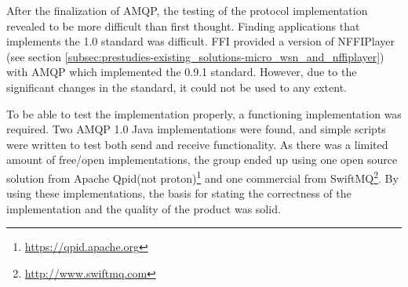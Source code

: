 After the finalization of AMQP, the testing of the protocol implementation revealed to be more difficult than first thought. Finding applications that implements the 1.0 standard was difficult. FFI provided a version of NFFIPlayer (see section \ref{subsec:prestudies-existing_solutions-micro_wsn_and_nffiplayer}) with AMQP which implemented the 0.9.1 standard. However, due to the significant changes in the standard, it could not be used to any extent.

To be able to test the implementation properly, a functioning implementation was required. Two AMQP 1.0 Java implementations were found, and simple scripts were written to test both send and receive functionality. As there was a limited amount of free/open implementations, the group ended up using one open source solution from Apache Qpid(not proton)\footnote{\url{https://qpid.apache.org}} and one commercial from SwiftMQ\footnote{\url{http://www.swiftmq.com}}. By using these implementations, the basis for stating the correctness of the implementation and the quality of the product was solid.

\clearpage